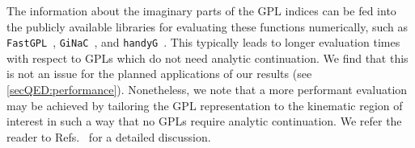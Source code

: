 \documentclass[main.tex]{subfiles}
\begin{document}
\smallskip

The information about the imaginary parts of the GPL indices can be fed into the publicly available libraries for evaluating these functions numerically, such as \texttt{FastGPL}~\cite{Wang:2021imw}, \texttt{GiNaC}~\cite{Bauer:2000cp, Vollinga:2004sn}, and \texttt{handyG}~\cite{Naterop:2019xaf}. This typically leads to longer evaluation times with respect to GPLs which do not need analytic continuation. We find that this is not an issue for the planned applications of our results (see \cref{secQED:performance}). Nonetheless, we note that a more performant evaluation may be achieved by tailoring the GPL representation to the kinematic region of interest in such a way that no GPLs require analytic continuation. We refer the reader to Refs.~\cite{Gehrmann:2002zr, Gehrmann:2023etk} for a detailed discussion. 
\end{document}
